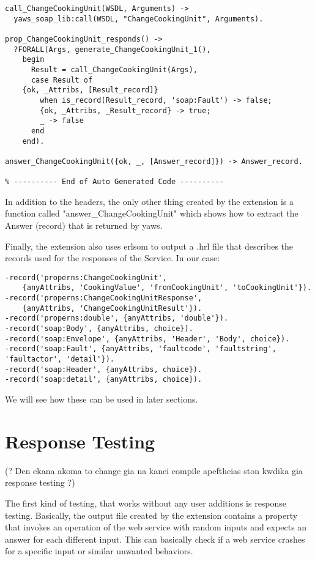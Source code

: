 \documentclass[11pt]{article} %
\begin{document}
\begin{lstlisting}
call_ChangeCookingUnit(WSDL, Arguments) ->
  yaws_soap_lib:call(WSDL, "ChangeCookingUnit", Arguments).

prop_ChangeCookingUnit_responds() ->
  ?FORALL(Args, generate_ChangeCookingUnit_1(),
    begin
      Result = call_ChangeCookingUnit(Args),
      case Result of
	{ok, _Attribs, [Result_record]} 
	    when is_record(Result_record, 'soap:Fault') -> false;
        {ok, _Attribs, _Result_record} -> true;
        _ -> false
      end
    end).

answer_ChangeCookingUnit({ok, _, [Answer_record]}) -> Answer_record.

% ---------- End of Auto Generated Code ---------- 
\end{lstlisting}

In addition to the headers, the only other thing created by the extension is a function called "answer\_ChangeCookingUnit" which shows how to extract the Answer (record) that is returned by yaws.

Finally, the extension also uses erlsom to output a .hrl file that describes the records used for the responses of the Service. In our case:

\begin{lstlisting}
-record('properns:ChangeCookingUnit', 
	{anyAttribs, 'CookingValue', 'fromCookingUnit', 'toCookingUnit'}).
-record('properns:ChangeCookingUnitResponse', 
	{anyAttribs, 'ChangeCookingUnitResult'}).
-record('properns:double', {anyAttribs, 'double'}).
-record('soap:Body', {anyAttribs, choice}).
-record('soap:Envelope', {anyAttribs, 'Header', 'Body', choice}).    
-record('soap:Fault', {anyAttribs, 'faultcode', 'faultstring', 'faultactor', 'detail'}).  
-record('soap:Header', {anyAttribs, choice}).
-record('soap:detail', {anyAttribs, choice}).
\end{lstlisting}

We will see how these can be used in later sections.

\section{Response Testing}

(? Den ekana akoma to change gia na kanei compile apeftheias ston kwdika gia response testing ?)

The first kind of testing, that works without any user additions is response testing. Basically, the output file created by the extension contains a property that invokes an operation of the web service with random inputs and expects an answer for each different input. This can basically check if a web service crashes for a specific input or similar unwanted behaviors. 
\end{document}
